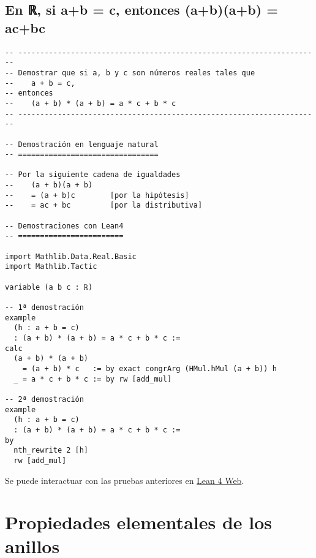 \section{En ℝ, si a+b = c, entonces (a+b)(a+b) = ac+bc}
\label{sec:orgcf6ca04}
\begin{verbatim}
-- ---------------------------------------------------------------------
-- Demostrar que si a, b y c son números reales tales que
--    a + b = c,
-- entonces
--    (a + b) * (a + b) = a * c + b * c
-- ---------------------------------------------------------------------

-- Demostración en lenguaje natural
-- ================================

-- Por la siguiente cadena de igualdades
--    (a + b)(a + b)
--    = (a + b)c        [por la hipótesis]
--    = ac + bc         [por la distributiva]

-- Demostraciones con Lean4
-- ========================

import Mathlib.Data.Real.Basic
import Mathlib.Tactic

variable (a b c : ℝ)

-- 1ª demostración
example
  (h : a + b = c)
  : (a + b) * (a + b) = a * c + b * c :=
calc
  (a + b) * (a + b)
    = (a + b) * c   := by exact congrArg (HMul.hMul (a + b)) h
  _ = a * c + b * c := by rw [add_mul]

-- 2ª demostración
example
  (h : a + b = c)
  : (a + b) * (a + b) = a * c + b * c :=
by
  nth_rewrite 2 [h]
  rw [add_mul]
\end{verbatim}
Se puede interactuar con las pruebas anteriores en \href{https://lean.math.hhu.de/\#url=https://raw.githubusercontent.com/jaalonso/Calculemus2/main/src/Sia+b\_eq\_c\_entonces\_(a+b)(a+b)\_eq\_ac+bc.lean}{Lean 4 Web}.

\chapter{Propiedades elementales de los anillos}
\label{sec:org0189707}

